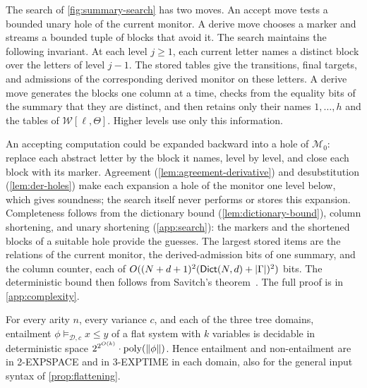 The search of \cref{fig:summary-search} has two moves. An accept move tests
a bounded unary hole of the current monitor. A derive move chooses a marker
and streams a bounded tuple of blocks that avoid it. The search maintains
the following invariant. At each level $j\ge1$, each current letter names a
distinct block over the letters of level $j-1$. The stored tables give the
transitions, final targets, and admissions of the corresponding derived
monitor on these letters. A derive move generates the blocks one column at a
time, checks from the equality bits of the summary that they are distinct,
and then retains only their names $1,\ldots,h$ and the tables of
$\mathcal W[\ell,\Theta]$. Higher levels use only this information.

An accepting computation could be expanded backward into a hole of
$\mathcal M_0$: replace each abstract letter by the block it names, level by
level, and close each block with its marker. Agreement
(\cref{lem:agreement-derivative}) and desubstitution (\cref{lem:der-holes})
make each expansion a hole of the monitor one level below, which gives
soundness; the search itself never performs or stores this expansion.
Completeness follows from the dictionary bound (\cref{lem:dictionary-bound}),
column shortening, and unary shortening (\cref{app:search}): the markers and
the shortened blocks of a suitable hole provide the guesses. The largest
stored items are the relations of the current monitor, the derived-admission
bits of one summary, and the column counter, each of
$O((N+d+1)^2(\mathsf{Dict}(N,d)+|\Gamma|)^2)$ bits. The deterministic bound then
follows from Savitch's theorem~\citep{Savitch70}. The full proof is in
\cref{app:complexity}.

\begin{theorem}\label{thm:complexity}\label{cor:complexity}
For every arity $n$, every variance $c$, and each of the three tree domains,
entailment $\phi\models_{\mathcal D,c}x\le y$ of a flat system with $k$
variables is decidable in deterministic space
$2^{2^{O(k)}}\cdot\operatorname{poly}(\|\phi\|)$. Hence entailment and
non-entailment are in 2-EXPSPACE and in 3-EXPTIME in each domain, also for
the general input syntax of \cref{prop:flattening}.
\end{theorem}

